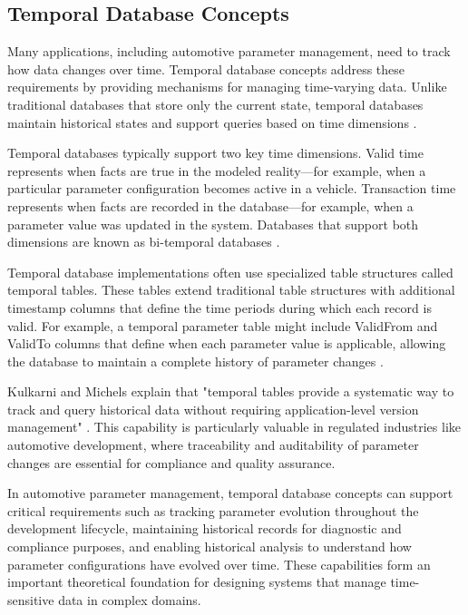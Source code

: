 \subsection{Temporal Database Concepts}
\label{subsec}

Many applications, including automotive parameter management, need to track how data changes over time. Temporal database concepts address these requirements by providing mechanisms for managing time-varying data. Unlike traditional databases that store only the current state, temporal databases maintain historical states and support queries based on time dimensions \cite{snodgrass1999developing}.

Temporal databases typically support two key time dimensions. Valid time represents when facts are true in the modeled reality—for example, when a particular parameter configuration becomes active in a vehicle. Transaction time represents when facts are recorded in the database—for example, when a parameter value was updated in the system. Databases that support both dimensions are known as bi-temporal databases \cite{kulkarni2012temporal}.

Temporal database implementations often use specialized table structures called temporal tables. These tables extend traditional table structures with additional timestamp columns that define the time periods during which each record is valid. For example, a temporal parameter table might include ValidFrom and ValidTo columns that define when each parameter value is applicable, allowing the database to maintain a complete history of parameter changes \cite{salzberg1999comparison}.

Kulkarni and Michels explain that "temporal tables provide a systematic way to track and query historical data without requiring application-level version management" \cite{kulkarni2012temporal}. This capability is particularly valuable in regulated industries like automotive development, where traceability and auditability of parameter changes are essential for compliance and quality assurance.

In automotive parameter management, temporal database concepts can support critical requirements such as tracking parameter evolution throughout the development lifecycle, maintaining historical records for diagnostic and compliance purposes, and enabling historical analysis to understand how parameter configurations have evolved over time. These capabilities form an important theoretical foundation for designing systems that manage time-sensitive data in complex domains.

